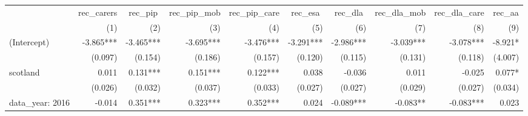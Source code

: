 \begin{tabular}{lrrrrrrrrr}
\toprule
                             & \multicolumn{1}{c}{rec_carers} & \multicolumn{1}{c}{rec_pip} & \multicolumn{1}{c}{rec_pip_mob} & \multicolumn{1}{c}{rec_pip_care} & \multicolumn{1}{c}{rec_esa} & \multicolumn{1}{c}{rec_dla} & \multicolumn{1}{c}{rec_dla_mob} & \multicolumn{1}{c}{rec_dla_care} & \multicolumn{1}{c}{rec_aa} \\ 
\cmidrule(lr){2-2} \cmidrule(lr){3-3} \cmidrule(lr){4-4} \cmidrule(lr){5-5} \cmidrule(lr){6-6} \cmidrule(lr){7-7} \cmidrule(lr){8-8} \cmidrule(lr){9-9} \cmidrule(lr){10-10} 
                             &                            (1) &                         (2) &                             (3) &                              (4) &                         (5) &                         (6) &                             (7) &                              (8) &                        (9) \\ 
\midrule
(Intercept)                  &                      -3.865*** &                   -3.465*** &                       -3.695*** &                        -3.476*** &                   -3.291*** &                   -2.986*** &                       -3.039*** &                        -3.078*** &                    -8.921* \\ 
                             &                        (0.097) &                     (0.154) &                         (0.186) &                          (0.157) &                     (0.120) &                     (0.115) &                         (0.131) &                          (0.118) &                    (4.007) \\ 
scotland                     &                          0.011 &                    0.131*** &                        0.151*** &                         0.122*** &                       0.038 &                      -0.036 &                           0.011 &                           -0.025 &                     0.077* \\ 
                             &                        (0.026) &                     (0.032) &                         (0.037) &                          (0.033) &                     (0.027) &                     (0.027) &                         (0.029) &                          (0.027) &                    (0.034) \\ 
data_year: 2016              &                         -0.014 &                    0.351*** &                        0.323*** &                         0.352*** &                       0.024 &                   -0.089*** &                        -0.083** &                        -0.083*** &                      0.023 \\ 

\end{tabular}

